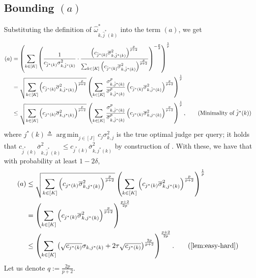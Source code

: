 \documentclass{article}
\DeclareMathOperator*{\argmin}{arg\,min}
\theoremstyle{plain}
\theoremstyle{definition}
\theoremstyle{plain}
\begin{document}
\subsection{\texorpdfstring{Bounding $(a)$}{Bounding (a)}}
Substituting the definition of $\widehat{\omega}_{k,\hat{j}^*(k)}^*$ into the term $(a)$, we get
\begin{align}
    (a) &= \left( \sum_{k \in [K]} \left( \frac{1}{c_{\hat{j}^*(k)} \sigma_{k,\hat{j}^*(k)}^2} \cdot \frac{\left( c_{\hat{j}^*(k)} \overline{\sigma}_{k,\hat{j}^*(k)}^2 \right)^{\frac{p}{p+2}}}{\sum_{k\in[K]} \left( c_{\hat{j}^*(k)} \overline{\sigma}_{k,\hat{j}^*(k)}^2 \right)^{\frac{p}{p+2}}} \right)^{-\frac{p}{2}} \right)^{\frac{1}{p}} \\
    &= \sqrt{\sum_{k\in[K]} \left( c_{\hat{j}^*(k)} \overline{\sigma}_{k,\hat{j}^*(k)}^2 \right)^{\frac{p}{p+2}}}
    \left( \sum_{k \in [K]} \frac{\sigma_{k,\hat{j}^*(k)}^p}{\overline{\sigma}_{k,\hat{j}^*(k)}^p} \left( c_{\hat{j}^*(k)} \overline{\sigma}_{k,\hat{j}^*(k)}^2 \right)^{\frac{p}{p+2}} \right)^{\frac{1}{p}} \\
    &\leq \sqrt{\sum_{k\in[K]} \left( c_{j^*(k)} \overline{\sigma}_{k,j^*(k)}^2 \right)^{\frac{p}{p+2}}}
    \left( \sum_{k \in [K]} \frac{\sigma_{k,\hat{j}^*(k)}^p}{\overline{\sigma}_{k,\hat{j}^*(k)}^p} \left( c_{j^*(k)} \overline{\sigma}_{k,j^*(k)}^2 \right)^{\frac{p}{p+2}} \right)^{\frac{1}{p}}, \tag{Minimality of $\hat{j}^*(k)$}
\end{align}
where $j^*(k) \triangleq \argmin_{j \in [J]} c_j \sigma_{k,j}^2$ is the true optimal judge per query; it holds that $c_{\hat{j}^*(k)} \overline{\sigma}_{k,\hat{j}^*(k)}^2\leq c_{j^*(k)} \overline{\sigma}_{k,j^*(k)}^2$ by construction of .
With these, we have that with probability at least $1 - 2 \delta$,
\begin{align}
    (a) &\leq \sqrt{\sum_{k\in[K]} \left( c_{j^*(k)} \overline{\sigma}_{k,j^*(k)}^2 \right)^{\frac{p}{p+2}}}
    \left( \sum_{k \in [K]} \left( c_{j^*(k)} \overline{\sigma}_{k,j^*(k)}^2 \right)^{\frac{p}{p+2}} \right)^{\frac{1}{p}} \\
    &= \left( \sum_{k\in[K]} \left( c_{j^*(k)} \overline{\sigma}_{k,j^*(k)}^2 \right)^{\frac{p}{p+2}} \right)^{\frac{p+2}{2p}} \label{eqn:empirical-A} \\
    &\leq \left( \sum_{k\in[K]} \left( \sqrt{c_{j^*(k)}} \sigma_{k,j^*(k)} + 2 \tau \sqrt{c_{j^*(k)}} \right)^{\frac{2p}{p+2}} \right)^{\frac{p+2}{2p}}. \tag{\Cref{lem:easy-hard}}
\end{align}
Let us denote $q := \frac{2p}{p + 2}$.
\end{document}
